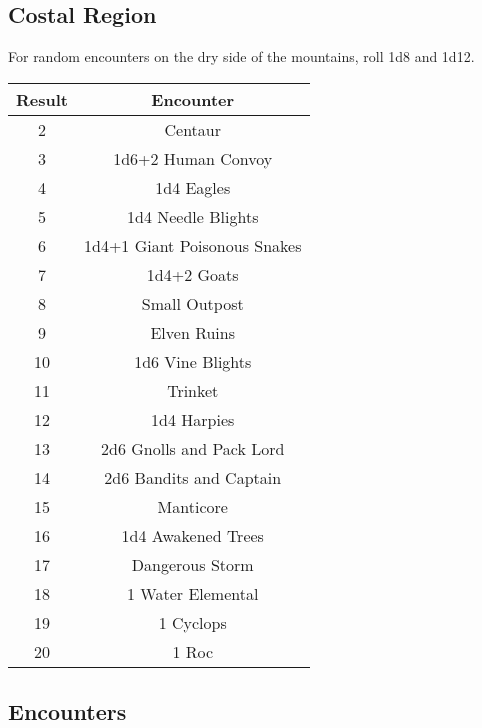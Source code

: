\subsection{Costal Region}

For random encounters on the dry side of the mountains, roll 1d8 and 1d12.

\begin{tabular}{|c|c|}

\hline

\textbf{Result} & \textbf{Encounter}\\

\hline

2 & Centaur\\

3 & 1d6+2 Human Convoy\\

4 & 1d4 Eagles\\

5 & 1d4 Needle Blights\\

6 & 1d4+1 Giant Poisonous Snakes\\

7 & 1d4+2 Goats\\

8 & Small Outpost\\

9 & Elven Ruins\\

10 & 1d6 Vine Blights\\

11 & Trinket\\

12 & 1d4 Harpies\\

13 & 2d6 Gnolls and Pack Lord\\

14 & 2d6 Bandits and Captain\\

15 & Manticore\\

16 & 1d4 Awakened Trees\\

17 & Dangerous Storm\\

18 & 1 Water Elemental\\

19 & 1 Cyclops\\

20 & 1 Roc\\

\hline

\end{tabular}

\subsection{Encounters}
